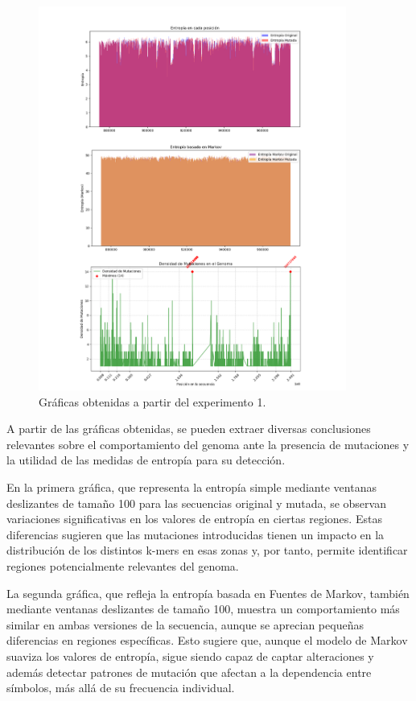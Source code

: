 \documentclass[11pt,spanish,listoffigures,listoftables]{tfgetsinf}
\begin{document}
\begin{figure}[H]
      \centering
      \includegraphics[width=0.9\textwidth]{graf_exp1.png}
      \caption{Gráficas obtenidas a partir del experimento 1.}
      \label{fig:etiqueta_opcional12}
\end{figure}

A partir de las gráficas obtenidas, se pueden extraer diversas conclusiones relevantes sobre el comportamiento del genoma ante la presencia de mutaciones y la utilidad de las medidas de entropía para su detección.  

En la primera gráfica, que representa la entropía simple mediante ventanas deslizantes de tamaño 100 para las secuencias original y mutada, se observan variaciones significativas en los valores de entropía en ciertas regiones. Estas diferencias sugieren que las mutaciones introducidas tienen un impacto en la distribución de los distintos k-mers en esas zonas y, por tanto, permite identificar regiones potencialmente relevantes del genoma. 

La segunda gráfica, que refleja la entropía basada en Fuentes de Markov, también mediante ventanas deslizantes de tamaño 100, muestra un comportamiento más similar en ambas versiones de la secuencia, aunque se aprecian pequeñas diferencias en regiones específicas. Esto sugiere que, aunque el modelo de Markov suaviza los valores de entropía, sigue siendo capaz de captar alteraciones y además detectar patrones de mutación que afectan a la dependencia entre símbolos, más allá de su frecuencia individual.  
\end{document}
